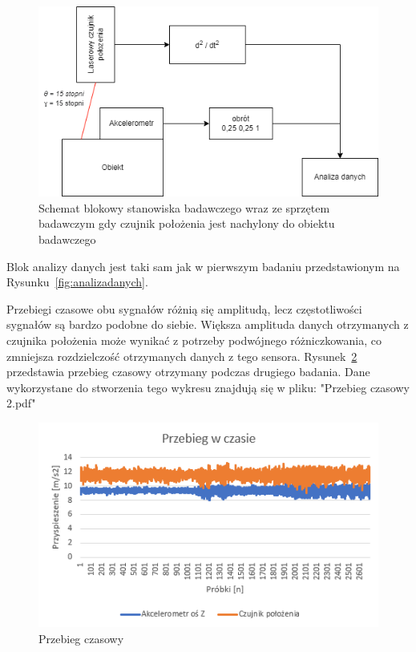 \documentclass[a4paper, 12pt]{mwart}
\begin{document}
\begin{figure}[h!]
	\centering
	\includegraphics[width=0.9\linewidth]{assets/wibro2}
	\caption{Schemat blokowy stanowiska badawczego wraz ze sprzętem badawczym gdy czujnik położenia jest nachylony do obiektu badawczego}
	\label{fig:wibro2}
\end{figure}

Blok analizy danych jest taki sam jak w pierwszym badaniu przedstawionym na Rysunku~\ref{fig:analizadanych}.

Przebiegi czasowe obu sygnałów różnią się amplitudą, lecz częstotliwości sygnałów są bardzo podobne do siebie. Większa amplituda danych otrzymanych z czujnika położenia może wynikać z potrzeby podwójnego różniczkowania, co zmniejsza rozdzielczość otrzymanych danych z tego sensora. Rysunek~\ref{fig:timeplot2} przedstawia przebieg czasowy otrzymany podczas drugiego badania. Dane wykorzystane do stworzenia tego wykresu znajdują się w pliku: "Przebieg czasowy 2.pdf"
\begin{figure}[h!]
	\centering
	\includegraphics[width=0.9\linewidth]{assets/timePlot2}
	\caption{Przebieg czasowy}
	\label{fig:timeplot2}
\end{figure}
\end{document}
